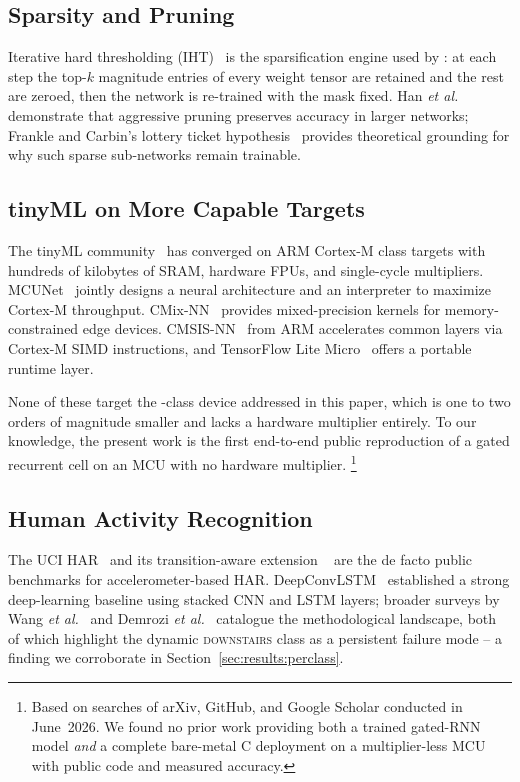 \subsection{Sparsity and Pruning}

Iterative hard thresholding (IHT)~\cite{blumensath2009iht} is the
sparsification engine used by \fastgrnn{}: at each step the
top-$k$ magnitude entries of every weight tensor are retained and
the rest are zeroed, then the network is re-trained with the mask
fixed. Han \emph{et al.}~\cite{han2015pruning} demonstrate that
aggressive pruning preserves accuracy in larger
networks; Frankle and Carbin's lottery ticket
hypothesis~\cite{frankle2019lt} provides theoretical grounding for
why such sparse sub-networks remain trainable.

\subsection{tinyML on More Capable Targets}

The tinyML community~\cite{banbury2021mlperf} has converged on
ARM Cortex-M class targets with hundreds of kilobytes of SRAM,
hardware FPUs, and single-cycle multipliers.
MCUNet~\cite{lin2020mcunet} jointly designs a neural architecture
and an interpreter to maximize Cortex-M throughput.
CMix-NN~\cite{capotondi2020cmixnn} provides mixed-precision
kernels for memory-constrained edge devices.
CMSIS-NN~\cite{lai2018cmsisnn} from ARM accelerates common layers
via Cortex-M SIMD instructions, and TensorFlow Lite
Micro~\cite{david2021tflitemicro} offers a portable runtime layer.

None of these target the \msp{}-class device addressed in
this paper, which is one to two orders of magnitude smaller and
lacks a hardware multiplier entirely. To our knowledge, the present
work is the first end-to-end public reproduction of a gated
recurrent cell on an MCU with no hardware multiplier.%
\footnote{Based on searches of arXiv, GitHub, and Google Scholar
conducted in June~2026. We found no prior work providing both
a trained gated-RNN model \emph{and} a complete bare-metal
C deployment on a multiplier-less MCU with public code and
measured accuracy.}

\subsection{Human Activity Recognition}

The UCI HAR~\cite{anguita2013public} and its transition-aware
extension \hapt{}~\cite{reyes2015transition} are the de facto
public benchmarks for accelerometer-based HAR.
DeepConvLSTM~\cite{ordonez2016deepconvlstm} established a strong
deep-learning baseline using stacked CNN and LSTM layers; broader
surveys by Wang \emph{et al.}~\cite{wang2019harsurvey} and
Demrozi \emph{et al.}~\cite{demrozi2020harsurvey} catalogue the
methodological landscape, both of which highlight the dynamic
\textsc{downstairs} class as a persistent failure
mode -- a finding we corroborate in
Section~\ref{sec:results:perclass}.
